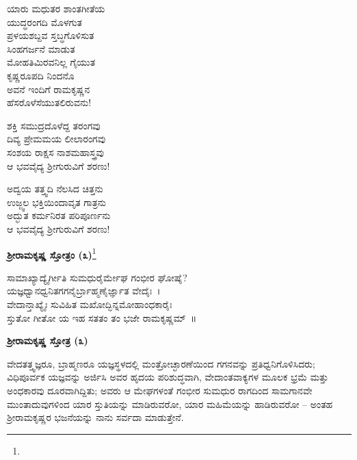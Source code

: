 \begin{myquote}
ಯಾರು ಮಧುತರ ಶಾಂತಗೀತೆಯ\\ಯುದ್ಧರಂಗದಿ ಮೊಳಗುತ\\ಪ್ರಳಯಶಬ್ದವ ಸ್ತಬ್ಧಗೊಳಿಸುತ\\ಸಿಂಹಗರ್ಜನೆ ಮಾಡುತ\\ಮೋಹತಿಮಿರವನಿಲ್ಲ ಗೈಯುತ\\ಕೃಷ್ಣರೂಪದಿ ನಿಂದನೊ\\ಅವನೆ ಇಂದಿಗೆ ರಾಮಕೃಷ್ಣನ\\ಹೆಸರೊಳೆಸೆಯುತಲಿರುವನು!
\end{myquote}

\begin{myquote}
ಶಕ್ತಿ ಸಮುದ್ರದೊಳೆದ್ದ ತರಂಗವು\\ದಿವ್ಯ ಪ್ರೇಮಮಯ ಲೀಲಾರಂಗವು\\ಸಂಶಯ ರಾಕ್ಷಸ ನಾಶಮಹಾಸ್ತ್ರವು\\ಆ ಭವವೈದ್ಯ ಶ‍್ರೀಗುರುವಿಗೆ ಶರಣು!
\end{myquote}

\begin{myquote}
ಅದ್ವಯ ತತ್ತ್ವದಿ ನೆಲಸಿದ ಚಿತ್ತನು\\ಉಜ್ಜ್ವಲ ಭಕ್ತಿಯಿಂದಾವೃತ ಗಾತ್ರನು\\ಅದ್ಭುತ ಕರ್ಮನಿರತ ಪರಿಪೂರ್ಣನು\\ಆ ಭವವೈದ್ಯ ಶ‍್ರೀಗುರುವಿಗೆ ಶರಣು!
\end{myquote}

\begin{center}
\textbf{ಶ‍್ರೀರಾಮಕೃಷ್ಣ ಸ್ತೋತ್ರಂ (೩)}\footnote{}
\end{center}

\begin{myquote}
ಸಾಮಾಖ್ಯಾದ್ಯೈರ್ಗೀತಿ ಸುಮಧುರೈರ್ಮೇಘ ಗಂಭೀರ ಘೋಷೈ?\\ಯಜ್ಞಧ್ವಾನಧ್ವನಿತಗಗನೈರ್ಬ್ರಾಹ್ಮಣೈರ್ಜ್ಞಾತ ವೇದೈಃ~।\\ವೇದಾನ್ತಾಖ್ಯೈಃ ಸುವಿಹಿತ ಮಖೋದ್ಭಿನ್ನಮೋಹಾಂಧಕಾರೈಃ\\ಸ್ತುತೋ ಗೀತೋ ಯ ಇಹ ಸತತಂ ತಂ ಭಜೇ ರಾಮಕೃಷ್ಣಮ್~॥
\end{myquote}

\begin{center}
\textbf{ಶ‍್ರೀರಾಮಕೃಷ್ಣ ಸ್ತೋತ್ರ (೩)}
\end{center}

ವೇದತತ್ತ್ವಜ್ಞರೂ, ಬ್ರಾಹ್ಮಣರೂ ಯಜ್ಞಸ್ಥಳದಲ್ಲಿ ಮಂತ್ರೋಚ್ಛಾರಣೆಯಿಂದ ಗಗನವನ್ನು ಪ್ರತಿಧ್ವನಿಗೊಳಿಸಿದರು; ವಿಧಿಪೂರ್ವಕ ಯಜ್ಞವನ್ನು ಅರ್ಜಿಸಿ ಅವರ ಹೃದಯ ಪರಿಶುದ್ಧವಾಗಿ, ವೇದಾಂತವಾಕ್ಯಗಳ ಮೂಲಕ ಭ್ರಮೆ ಮತ್ತು ಅಂಧಕಾರವು ದೂರವಾಗಿದ್ದಿತು; ಅವರು ಆ ಮೇಘಗಳಂತೆ ಗಂಭೀರ ಸುಮಧುರ ರಾಗದಿಂದ ಸಾಮಗಾನವೇ ಮುಂತಾದುವುಗಳಿಂದ ಯಾರ ಸ್ತುತಿಯನ್ನು ಮಾಡಿರುವರೋ, ಯಾರ ಮಹಿಮೆಯನ್ನು ಹಾಡಿರುವರೋ – ಅಂತಹ ಶ‍್ರೀರಾಮಕೃಷ್ಣರ ಭಜನೆಯನ್ನು ನಾನು ಸರ್ವದಾ ಮಾಡುತ್ತೇನೆ.

